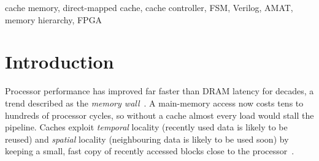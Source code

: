 \documentclass[conference]{IEEEtran}
\begin{document}
\begin{abstract}
The widening gap between processor and DRAM speed makes the cache the most important
component of the memory hierarchy. This paper presents the design, verification and
evaluation of a synthesizable direct-mapped cache controller written in Verilog-2005. The
cache holds 1\,KB in 64 lines of 16-byte blocks, decodes 32-bit addresses into a 22-bit tag,
6-bit index and 4-bit offset, and is controlled by a four-state finite-state machine
implementing a read-allocate, write-through, no-write-allocate policy. A self-checking
directed testbench (16/16 checks passing) verifies cold, conflict and capacity behaviour,
write-through correctness and valid-bit reset. A trace-driven testbench runs seven
synthetic workloads and cross-checks every load value, every hit/miss decision and the total
cycle count against an independent Python reference model; all 28 runs over four cache
geometries match exactly. With a 10-cycle main memory, the cache achieves a 97.5\% hit rate
and a 5.22$\times$ speed-up on a loop-oriented workload and 2.40$\times$ on a streaming workload,
while pathological conflict patterns expose the main weakness of direct mapping.
Yosys/nextpnr synthesis reports 256 flip-flops and a post-route $F_{max}$ of 61.4\,MHz on a
Lattice ECP5 FPGA.
\end{abstract}

\begin{IEEEkeywords}
cache memory, direct-mapped cache, cache controller, FSM, Verilog, AMAT, memory hierarchy, FPGA
\end{IEEEkeywords}

\section{Introduction}
Processor performance has improved far faster than DRAM latency for decades, a trend
described as the \emph{memory wall}~\cite{wulf1995}. A main-memory access now costs tens to
hundreds of processor cycles, so without a cache almost every load would stall the pipeline.
Caches exploit \emph{temporal} locality (recently used data is likely to be reused) and
\emph{spatial} locality (neighbouring data is likely to be used soon) by keeping a small,
fast copy of recently accessed blocks close to the processor~\cite{hp_quant,hp_cod}.
\end{document}

